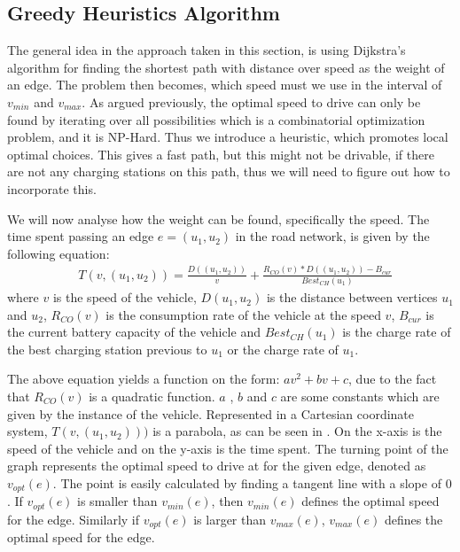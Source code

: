 \subsection{Greedy Heuristics Algorithm}

The general idea in the approach taken in this section, is using Dijkstra's algorithm for finding the shortest path with distance over speed as the weight of an edge. The problem then becomes, which speed must we use in the interval of $v_{min}$ and $v_{max}$. As argued previously, the optimal speed to drive can only be found by iterating over all possibilities which is a combinatorial optimization problem, and it is NP-Hard. Thus we introduce a heuristic, which promotes local optimal choices. This gives a fast path, but this might not be drivable, if there are not any charging stations on this path, thus we will need to figure out how to incorporate this.

We will now analyse how the weight can be found, specifically the speed. The time spent passing an edge $e = (u_1, u_2)$ in the road network, is given by the following equation:
\begin{equation*}
\begin{aligned}
 & T(v,(u_1, u_2)) = \frac{D((u_1, u_2))}{v} + \frac{R_{CO}(v) * D((u_1, u_2)) - B_{cur}}{Best_{CH}(u_1)}
\end{aligned}
\end{equation*}\label{eq:drivingAndCharging}
where $v$ is the speed of the vehicle, $D(u_1, u_2)$ is the distance between vertices $u_1$ and $u_2$, $R_{CO}(v)$ is the consumption rate of the vehicle at the speed $v$, $B_{cur}$ is the current battery capacity of the vehicle 
and $Best_{CH}(u_1)$ is the charge rate of the best charging station previous to $u_1$ or the charge rate of $u_1$.

The above equation yields a function on the form: $av^2 + bv + c$, due to the fact that 
$R_{CO}(v)$ is a quadratic function. $a$ , $b$ and $c$ are some constants which are given by the instance of the vehicle. 
Represented in a Cartesian coordinate system, $T(v,(u_1, u_2)))$ is a parabola, as can be seen in . On the x-axis is the speed of the vehicle and on the y-axis is the time spent. The turning point of the graph represents the optimal speed to drive at for the given edge, denoted as $v_{opt}(e)$. The point is easily calculated by finding a tangent line with a slope of $0$. If $v_{opt}(e)$ is smaller than $v_{min}(e)$, then $v_{min}(e)$ defines the optimal speed for the edge. Similarly if $v_{opt}(e)$ is larger than $v_{max}(e)$, $v_{max}(e)$ defines the optimal speed for the edge.


